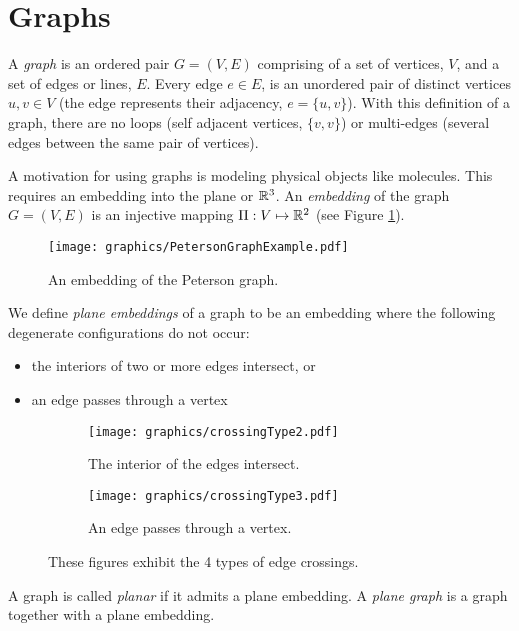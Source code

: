\section{Graphs}
A \textit{graph} is an 
ordered pair $G = (V,E)$ comprising of a set of vertices, $V$, and a set of edges or 
lines, $E$.  Every edge $e \in E$, is an unordered pair of distinct vertices $u,v \in V$ (the edge represents their adjacency, $e = \{ u,v\}$). With this definition of a graph, there 
are 
no loops (self adjacent vertices, $\{v,v\}$) or multi-edges (several edges between the same pair of 
vertices).

A motivation for using graphs is modeling physical objects like molecules.  This requires an 
embedding into the plane or ${\mathbb{R}}^3$.  An \textit{embedding} of the 
graph $G = (V,E)$ is an injective mapping $\Pi : V \mapsto {\mathbb{R}}^{2}$ (see Figure 
\ref{fig:graph1-1}). 

\begin{figure}[!htbp]
\begin{center}
\texttt{[image: graphics/PetersonGraphExample.pdf]}
\caption{An embedding of the Peterson graph.}\label{fig:graph1-1}
\end{center} 
\end{figure} 
We define \textit{plane embeddings} of a graph to be an embedding where the following degenerate 
configurations 
do not occur:
\begin{itemize}
\item[\rn{1}] the interiors of two or more edges intersect, or
\item[\rn{2}] an edge passes through a vertex
\end{itemize} 
\begin{figure}[H]
\begin{center}
  \begin{subfigure}[b]{0.49\textwidth}
	  \texttt{[image: graphics/crossingType2.pdf]}
	  \caption{The interior of the edges intersect.}
	  \label{fig:ch1-linkages-1-2}
  \end{subfigure}
  \begin{subfigure}[b]{0.49\textwidth}
	  \texttt{[image: graphics/crossingType3.pdf]}
	  \caption{An edge passes through a vertex.}
	  \label{fig:ch1-linkages-1-3}
  \end{subfigure}
\end{center} 
\caption{These figures exhibit the 4 types of edge crossings.}\label{fig:ch1-linkages-1}
\end{figure}
A graph is called \textit{planar} if it admits a plane embedding.  A \textit{plane graph} is a 
graph together with a plane embedding.
